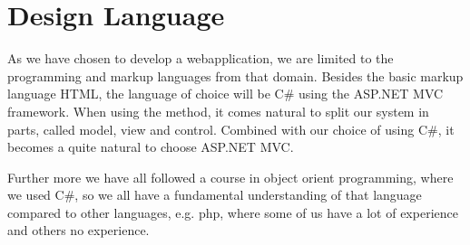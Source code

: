 \section{Design Language}
\label{sec:design_language}
As we have chosen to develop a webapplication, we are limited to the programming and markup languages from that domain.
Besides the basic markup language HTML, the language of choice will be C\# using the ASP.NET MVC framework.
When using the \ooad{} method, it comes natural to split our system in parts, called model, view and control. 
Combined with our choice of using C\#, it becomes a quite natural to choose ASP.NET MVC.

Further more we have all followed a course in object orient programming, where we used C\#, so we all have a fundamental understanding of that language compared to other languages, e.g. php, where some of us have a lot of experience and others no experience.
